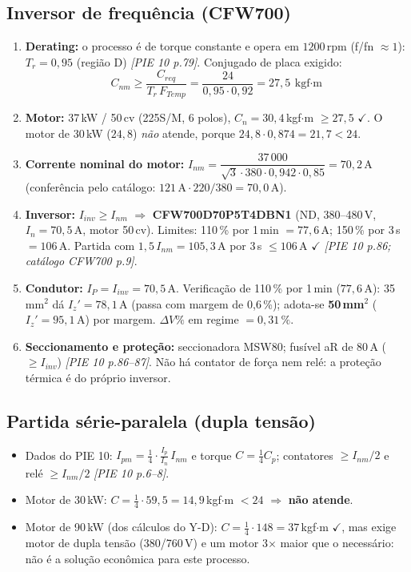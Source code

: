 \documentclass[11pt,a4paper]{article}
\newcommand{\src}[1]{\textit{[#1]}}
\begin{document}
\subsection{Inversor de frequ\^encia (CFW700)}
\begin{enumerate}[leftmargin=1.4em]
\item \textbf{Derating:} o processo \'e de torque constante e opera em $1200$\,rpm (f/fn $\approx 1$): $T_r=0{,}95$ (regi\~ao D) \src{PIE 10 p.79}. Conjugado de placa exigido:
\[
C_{nm}\ge\dfrac{C_{req}}{T_r\,F_{Temp}}=\dfrac{24}{0{,}95\cdot 0{,}92}=27{,}5\ \text{kgf$\cdot$m}
\]
\item \textbf{Motor:} 37\,kW / 50\,cv (225S/M, 6 polos), $C_n=30{,}4$\,kgf$\cdot$m $\ge 27{,}5$ $\checkmark$. O motor de 30\,kW ($24{,}8$) \emph{n\~ao} atende, porque $24{,}8\cdot 0{,}874=21{,}7<24$.
\item \textbf{Corrente nominal do motor:} $I_{nm}=\dfrac{37\,000}{\sqrt{3}\cdot 380\cdot 0{,}942\cdot 0{,}85}=70{,}2$\,A (confer\^encia pelo cat\'alogo: $121\,\text{A}\cdot 220/380=70{,}0$\,A).
\item \textbf{Inversor:} $I_{inv}\ge I_{nm}$ $\Rightarrow$ \textbf{CFW700D70P5T4DBN1} (ND, 380--480\,V, $I_n=70{,}5$\,A, motor 50\,cv). Limites: 110\,\% por 1\,min $=77{,}6$\,A; 150\,\% por 3\,s $=106$\,A. Partida com $1{,}5\,I_{nm}=105{,}3$\,A por 3\,s $\le 106$\,A $\checkmark$ \src{PIE 10 p.86; cat\'alogo CFW700 p.9}.
\item \textbf{Condutor:} $I_P=I_{inv}=70{,}5$\,A. Verifica\c{c}\~ao de 110\,\% por 1\,min ($77{,}6$\,A): 35\,mm$^2$ d\'a $I_z'=78{,}1$\,A (passa com margem de 0,6\,\%); adota-se \textbf{50\,mm$^2$} ($I_z'=95{,}1$\,A) por margem. $\Delta V\%$ em regime $=0{,}31\,\%$.
\item \textbf{Seccionamento e prote\c{c}\~ao:} seccionadora MSW80; fus\'ivel aR de 80\,A ($\ge I_{inv}$) \src{PIE 10 p.86--87}. N\~ao h\'a contator de for\c{c}a nem rel\'e: a prote\c{c}\~ao t\'ermica \'e do pr\'oprio inversor.
\end{enumerate}

\subsection{Partida s\'erie-paralela (dupla tens\~ao)}
\begin{itemize}[leftmargin=1.2em]
\item Dados do PIE 10: $I_{pm}=\tfrac{1}{4}\cdot\tfrac{I_p}{I_n}\,I_{nm}$ e torque $C=\tfrac{1}{4}C_p$; contatores $\ge I_{nm}/2$ e rel\'e $\ge I_{nm}/2$ \src{PIE 10 p.6--8}.
\item Motor de 30\,kW: $C=\tfrac{1}{4}\cdot 59{,}5=14{,}9$\,kgf$\cdot$m $<24$ $\Rightarrow$ \textbf{n\~ao atende}.
\item Motor de 90\,kW (dos c\'alculos do Y-D): $C=\tfrac{1}{4}\cdot 148=37$\,kgf$\cdot$m $\checkmark$, mas exige motor de dupla tens\~ao (380/760\,V) e um motor 3$\times$ maior que o necess\'ario: n\~ao \'e a solu\c{c}\~ao econ\^omica para este processo.
\end{itemize}
\end{document}
